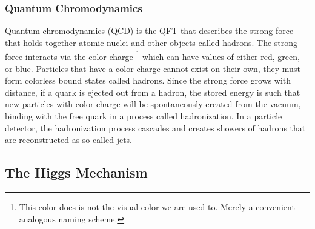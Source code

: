 
		\subsubsection{Quantum Chromodynamics}\label{sssec:QCD}
		
		Quantum chromodynamics (QCD) is the QFT that describes the strong force that holds together atomic nuclei and other objects called hadrons. The strong force interacts via the color charge \footnote{This color does is not the visual color we are used to. Merely a convenient analogous naming scheme.} which can have values of either red, green, or blue. Particles that have a color charge cannot exist on their own, they must form colorless bound states called hadrons. Since the strong force grows with distance, if a quark is ejected out from a hadron, the stored energy is such that new particles with color charge will be spontaneously created from the vacuum, binding with the free quark in a process called hadronization. In a particle detector, the hadronization process cascades and creates showers of hadrons that are reconstructed as so called jets.

	\subsection{The Higgs Mechanism}\label{ssec:Higgs}

